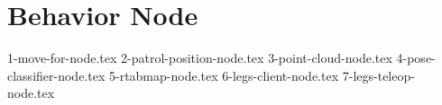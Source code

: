 \section{Behavior Node}
\label{sec:behaviornode}

\textcolor{red}{\lipsum[1-2]}

{1-move-for-node.tex}
{2-patrol-position-node.tex}
{3-point-cloud-node.tex}
{4-pose-classifier-node.tex}
{5-rtabmap-node.tex}
{6-legs-client-node.tex}
{7-legs-teleop-node.tex}
